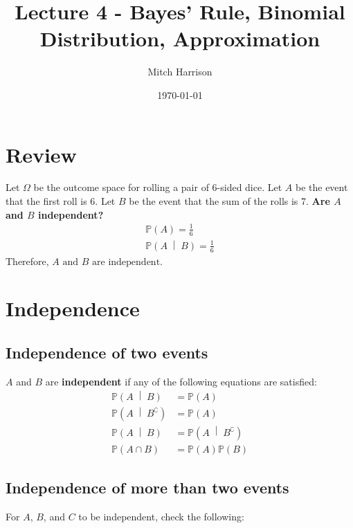 \documentclass[titlepage, 12pt, leqno]{article}
\title{\Huge{Lecture 4 - Bayes' Rule, Binomial Distribution, Approximation}}
\author{\large{Mitch Harrison}}
\date{\today}
\begin{document}
\setlength{\parskip}{1\baselineskip}
\setlength{\parindent}{15pt}
\maketitle
\tableofcontents
\newpage


\section{Review}
\begin{ex}
    Let $\Omega$ be the outcome space for rolling a pair of 6-sided dice. Let $A$ be the event that the first roll is 6. Let $B$ be the event that the sum of the rolls is 7. \textbf{Are $A$ and $B$ independent?} 
   \begin{align*}
       \mathbb{P}(A) = \frac{1}{6} \\
       \mathbb{P}\left(A \;\middle|\; B\right) = \frac{1}{6} 
   \end{align*}
Therefore, $\boxed{A \text{ and } B \text{ are independent.}}$    
\end{ex}
\pagebreak

\section{Independence}
\subsection{Independence of two events}
 $A$ and $B$ are \textbf{independent} if any of the following equations are satisfied:
\begin{align*}
    \mathbb{P}\left(A \;\middle|\; B\right) &= \mathbb{P}(A) \\
    \mathbb{P}\left(A \;\middle|\; B^\complement \right) &= \mathbb{P}(A) \\
    \mathbb{P}\left(A \;\middle|\; B\right) &= \mathbb{P}\left(A \;\middle|\; B^\complement \right) \\
    \mathbb{P}(A \cap B) &= \mathbb{P}(A)\mathbb{P}(B) 
\end{align*}

\subsection{Independence of more than two events}
For $A$, $B$, and $C$ to be independent, check the following:
\end{document}
